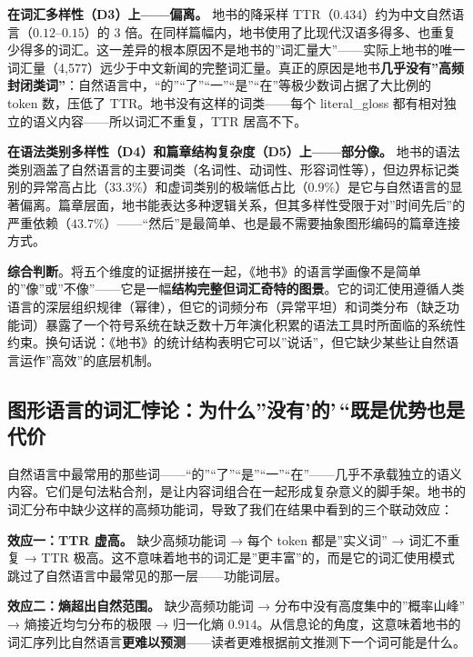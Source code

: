 \documentclass[12pt,a4paper,UTF8,fontset=founder]{ctexart}
\begin{document}
\textbf{在词汇多样性（D3）上------偏离。} 地书的降采样 TTR（$0.434$）约为中文自然语言（$0.12$--$0.15$）的 3 倍。在同样篇幅内，地书使用了比现代汉语多得多、也重复少得多的词汇。这一差异的根本原因不是地书的''词汇量大''------实际上地书的唯一词汇量（4,577）远少于中文新闻的完整词汇量。真正的原因是地书\textbf{几乎没有''高频封闭类词''}：自然语言中，``的''``了''``一''``是''``在''等极少数词占据了大比例的 token 数，压低了 TTR。地书没有这样的词类------每个 literal\_gloss 都有相对独立的语义内容------所以词汇不重复，TTR 居高不下。

\textbf{在语法类别多样性（D4）和篇章结构复杂度（D5）上------部分像。} 地书的语法类别涵盖了自然语言的主要词类（名词性、动词性、形容词性等），但边界标记类别的异常高占比（$33.3$\%）和虚词类别的极端低占比（$0.9$\%）是它与自然语言的显著偏离。篇章层面，地书能表达多种逻辑关系，但其多样性受限于对''时间先后''的严重依赖（$43.7$\%）------``然后''是最简单、也是最不需要抽象图形编码的篇章连接方式。

\textbf{综合判断}。将五个维度的证据拼接在一起，《地书》的语言学画像不是简单的''像''或''不像''------它是一幅\textbf{结构完整但词汇奇特的图景}。它的词汇使用遵循人类语言的深层组织规律（幂律），但它的词频分布（异常平坦）和词类分布（缺乏功能词）暴露了一个符号系统在缺乏数十万年演化积累的语法工具时所面临的系统性约束。换句话说：《地书》的统计结构表明它可以''说话''，但它缺少某些让自然语言运作''高效''的底层机制。

\subsection{图形语言的词汇悖论：为什么''没有'的'\,``既是优势也是代价}\label{ux56feux5f62ux8bedux8a00ux7684ux8bcdux6c47ux6096ux8bbaux4e3aux4ec0ux4e48ux6ca1ux6709ux7684ux65e2ux662fux4f18ux52bfux4e5fux662fux4ee3ux4ef7}

自然语言中最常用的那些词------``的''``了''``是''``一''``在''------几乎不承载独立的语义内容。它们是句法粘合剂，是让内容词组合在一起形成复杂意义的脚手架。地书的词汇分布中缺少这样的高频功能词，导致了我们在结果中看到的三个联动效应：

\textbf{效应一：TTR 虚高。} 缺少高频功能词 → 每个 token 都是''实义词'' → 词汇不重复 → TTR 极高。这不意味着地书的词汇是''更丰富''的，而是它的词汇使用模式跳过了自然语言中最常见的那一层------功能词层。

\textbf{效应二：熵超出自然范围。} 缺少高频功能词 → 分布中没有高度集中的''概率山峰'' → 熵接近均匀分布的极限 → 归一化熵 $0.914$。从信息论的角度，这意味着地书的词汇序列比自然语言\textbf{更难以预测}------读者更难根据前文推测下一个词可能是什么。
\end{document}
